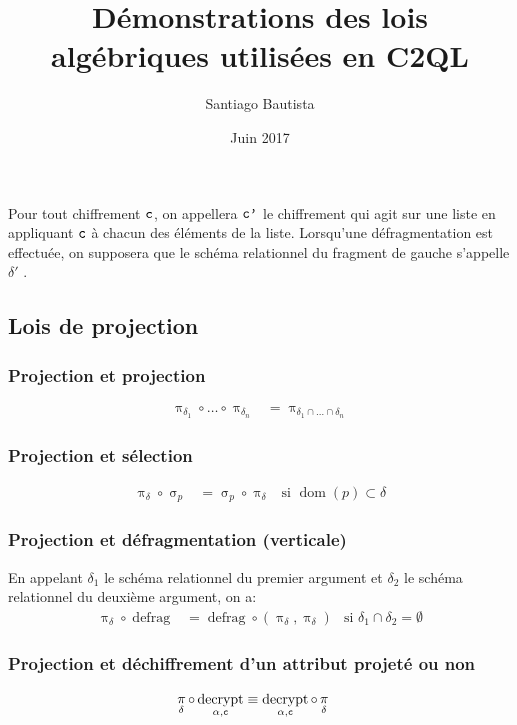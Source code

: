 \documentclass[french]{article}
\DeclareMathOperator{\proj}{\pi}
\DeclareMathOperator{\sel}{\sigma}
\DeclareMathOperator{\defrag}{defrag}
\DeclareMathOperator{\decrypt}{decrypt}
\DeclareMathOperator{\dom}{dom}
\newcommand\typeT[1]{\text{\ttfamily #1}}
\newcommand{\decryptArgs}[2]{\decrypt_{#1 , \typeT{#2}}}
\newcommand{\projDelta}{\proj_{\delta}}
\newcommand{\selP}{\sel_p}
\newcommand{\ch}{\typeT{c}}
\newcommand{\chp}{\typeT{c'}}
\begin{document}
\title{Démonstrations des lois algébriques utilisées en C2QL}
\author{Santiago Bautista}
\date{Juin 2017}
\maketitle

Pour tout chiffrement $\ch$,
on appellera $\chp$
le chiffrement qui agit sur une liste en appliquant
$\ch$ à chacun des éléments de la liste.
Lorsqu'une défragmentation est effectuée, on supposera que le schéma relationnel
du fragment de gauche s'appelle $\delta'$ .

\subsection*{Lois de projection}
\subsubsection*{Projection et projection}
\begin{align}
\proj_{\delta_1}\circ \dots \circ \proj_{\delta_n} 
& = \proj_{\delta_1 \cap \dots \cap \delta_n}
\end{align}

\subsubsection*{Projection et sélection}
\begin{align}
\projDelta \circ \selP
& = \selP \circ \projDelta
& \text{si $\dom(p) \subset \delta$}
\end{align}


\subsubsection*{Projection et défragmentation (verticale)}
En appelant $\delta_1$ le schéma relationnel du premier
argument et $\delta_2$ le schéma relationnel du deuxième
argument, on a:
\begin{align}
\projDelta \circ \defrag
& = \defrag \circ (\projDelta, \projDelta)
& \text{si $\delta_1 \cap \delta_2 = \emptyset$}
\end{align}
\subsubsection*{Projection et déchiffrement d'un attribut projeté ou non}
\begin{align}
\projDelta \circ \decryptArgs{\alpha}{c}
& \equiv \decryptArgs{\alpha}{c} \circ \projDelta
\end{align}
\end{document}
